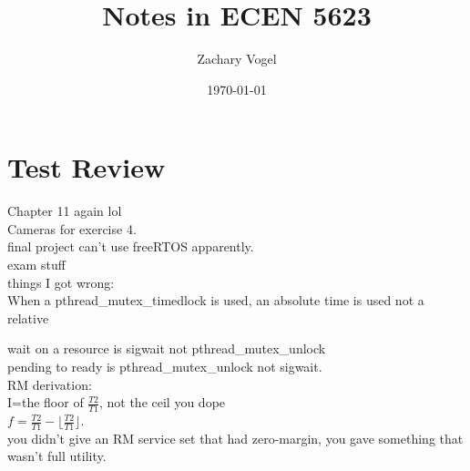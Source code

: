 \documentclass{article}
\author{Zachary Vogel}
\date{\today}
\title{Notes in ECEN 5623}
\begin{document}
\maketitle


\section*{Test Review}
Chapter 11 again lol\\
Cameras for exercise 4.\\
final project can't use freeRTOS apparently.\\
exam stuff\\

things I got wrong:\\
When a pthread\_mutex\_timedlock is used, an absolute time is used not a relative

wait on a resource is sigwait not pthread\_mutex\_unlock\\
pending to ready is pthread\_mutex\_unlock not sigwait.\\

RM derivation:\\
I=the floor of $\frac{T2}{T1}$, not the ceil you dope\\
$f=\frac{T2}{T1}-\lfloor \frac{T2}{T1}\rfloor$.\\

you didn't give an RM service set that had zero-margin, you gave something that wasn't full utility.\\
\end{document}
